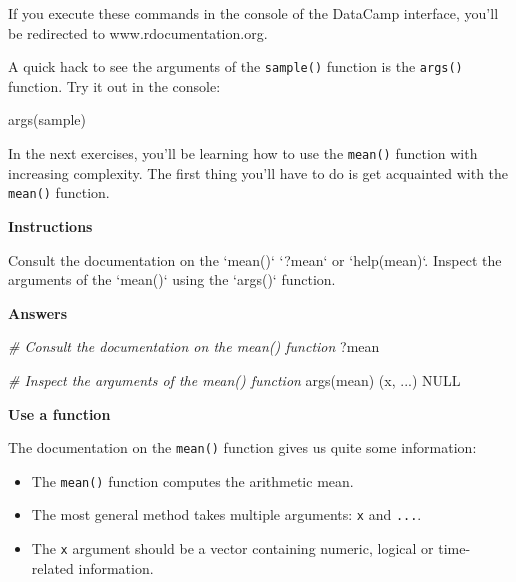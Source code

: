 \documentclass[]{article}
\providecommand{\tightlist}{%
  \setlength{\itemsep}{0pt}\setlength{\parskip}{0pt}}
\newcommand{\hlstr}[1]{\textcolor[rgb]{0.251,0.627,0.251}{#1}}%
\newcommand{\hlcom}[1]{\textcolor[rgb]{0.502,0.502,0.502}{\textit{#1}}}%
\newcommand{\hlstd}[1]{\textcolor[rgb]{0.251,0.251,0.251}{#1}}%
\newcommand{\hlkwc}[1]{\textcolor[rgb]{0.251,0.251,0.251}{#1}}%
\newcommand{\hlkwd}[1]{\textcolor[rgb]{0.878,0.439,0.125}{#1}}%
\newenvironment{Shaded}{\begin{myshaded}}{\end{myshaded}}
\newcommand{\KeywordTok}[1]{\hlkwd{#1}}
\newcommand{\DataTypeTok}[1]{\hlkwc{#1}}
\newcommand{\StringTok}[1]{\hlstr{#1}}
\newcommand{\CommentTok}[1]{\hlcom{#1}}
\newcommand{\OtherTok}[1]{{#1}}
\newcommand{\NormalTok}[1]{\hlstd{#1}}
\begin{document}
If you execute these commands in the console of the DataCamp interface,
you'll be redirected to www.rdocumentation.org.

A quick hack to see the arguments of the \texttt{sample()} function is
the \texttt{args()} function. Try it out in the console:

\begin{Shaded}
\begin{Highlighting}[]
\KeywordTok{args}\NormalTok{(sample)}
\end{Highlighting}
\end{Shaded}

In the next exercises, you'll be learning how to use the \texttt{mean()}
function with increasing complexity. The first thing you'll have to do
is get acquainted with the \texttt{mean()} function.

\textbf{Instructions}

\begin{Shaded}
\begin{Highlighting}[]
\OperatorTok{*}\StringTok{ }\NormalTok{Consult the documentation on the }\StringTok{`}\DataTypeTok{mean()}\StringTok{`} \OperatorTok{:}\StringTok{ `}\DataTypeTok{?mean}\StringTok{`}\NormalTok{ or }\StringTok{`}\DataTypeTok{help(mean)}\StringTok{`}\NormalTok{.}
\OperatorTok{*}\StringTok{ }\NormalTok{Inspect the arguments of the }\StringTok{`}\DataTypeTok{mean()}\StringTok{`} \NormalTok{ using the }\StringTok{`}\DataTypeTok{args()}\StringTok{`}\NormalTok{ function.}
\end{Highlighting}
\end{Shaded}

\textbf{Answers}

\begin{Shaded}
\begin{Highlighting}[]
\CommentTok{# Consult the documentation on the mean() function}
\NormalTok{?mean}

\CommentTok{# Inspect the arguments of the mean() function}
\KeywordTok{args}\NormalTok{(mean)}
   \NormalTok{ (x, ...) }
   \OtherTok{NULL}
\end{Highlighting}
\end{Shaded}

\textbf{Use a function}

The documentation on the \texttt{mean()} function gives us quite some
information:

\begin{itemize}
\tightlist
\item
  The \texttt{mean()} function computes the arithmetic mean.
\item
  The most general method takes multiple arguments: \texttt{x} and
  \texttt{...}.
\item
  The \texttt{x} argument should be a vector containing numeric, logical
  or time-related information.
\end{itemize}
\end{document}
